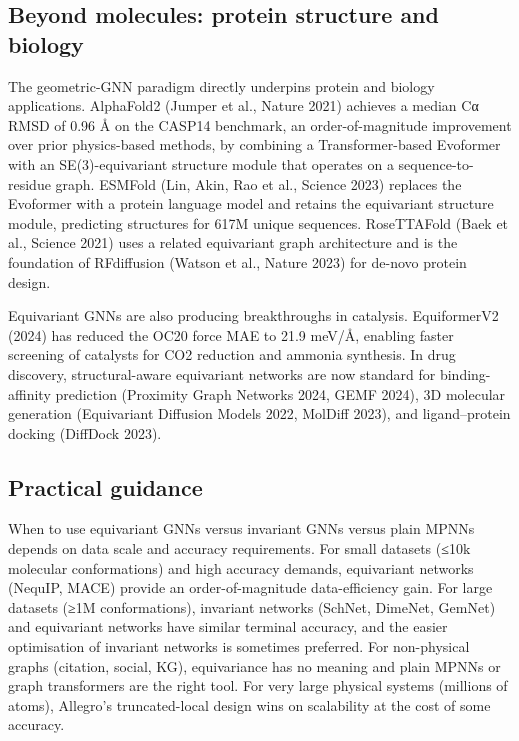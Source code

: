 \subsection{Beyond molecules: protein structure and biology}\label{beyond-molecules-protein-structure-and-biology}

The geometric-GNN paradigm directly underpins protein and biology applications. AlphaFold2 (Jumper et al., Nature 2021) achieves a median Cα RMSD of 0.96 Å on the CASP14 benchmark, an order-of-magnitude improvement over prior physics-based methods, by combining a Transformer-based Evoformer with an SE(3)-equivariant structure module that operates on a sequence-to-residue graph. ESMFold (Lin, Akin, Rao et al., Science 2023) replaces the Evoformer with a protein language model and retains the equivariant structure module, predicting structures for 617M unique sequences. RoseTTAFold (Baek et al., Science 2021) uses a related equivariant graph architecture and is the foundation of RFdiffusion (Watson et al., Nature 2023) for de-novo protein design.

Equivariant GNNs are also producing breakthroughs in catalysis. EquiformerV2 (2024) has reduced the OC20 force MAE to 21.9 meV/Å, enabling faster screening of catalysts for CO2 reduction and ammonia synthesis. In drug discovery, structural-aware equivariant networks are now standard for binding-affinity prediction (Proximity Graph Networks 2024, GEMF 2024), 3D molecular generation (Equivariant Diffusion Models 2022, MolDiff 2023), and ligand--protein docking (DiffDock 2023).

\subsection{Practical guidance}\label{practical-guidance}

When to use equivariant GNNs versus invariant GNNs versus plain MPNNs depends on data scale and accuracy requirements. For small datasets (≤10k molecular conformations) and high accuracy demands, equivariant networks (NequIP, MACE) provide an order-of-magnitude data-efficiency gain. For large datasets (≥1M conformations), invariant networks (SchNet, DimeNet, GemNet) and equivariant networks have similar terminal accuracy, and the easier optimisation of invariant networks is sometimes preferred. For non-physical graphs (citation, social, KG), equivariance has no meaning and plain MPNNs or graph transformers are the right tool. For very large physical systems (millions of atoms), Allegro's truncated-local design wins on scalability at the cost of some accuracy.

